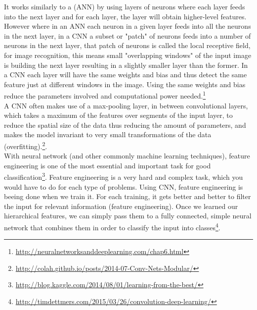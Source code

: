 \documentclass{article}
\begin{document}
It works similarly to a (ANN) by using layers of neurons where each layer feeds into the next layer and for each layer, the layer will obtain higher-level features.\\

However where in an ANN each neuron in a given layer feeds into all the neurons in the next layer, in a CNN a subset or "patch" of neurons feeds into a number of neurons in the next layer, that patch of neurons is called the local receptive field, for image recognition, this means small "overlapping windows" of the input image is building the next layer resulting in a slightly smaller layer than the former. In a CNN each layer will have the same weights and bias and thus detect the same feature just at different windows in the image. Using the same weights and bias reduce the parameters involved and computational power needed.\footnote{\url{http://neuralnetworksanddeeplearning.com/chap6.html}}\\

A CNN often makes use of a max-pooling layer, in between convolutional layers, which takes a maximum of the features over segments of the input layer, to reduce the spatial size of the data thus reducing the amount of parameters, and makes the model invariant to very small transformations of the data (overfitting).\footnote{\url{http://colah.github.io/posts/2014-07-Conv-Nets-Modular/}}.\\

With neural network (and other commonly machine learning techniques), feature engineering is one of the most essential and important task for good classification\footnote{\url{http://blog.kaggle.com/2014/08/01/learning-from-the-best/}}. Feature engineering is a very hard and complex task, which you would have to do for each type of problems. Using CNN, feature engineering is beeing done when we train it. 
For each training, it gets better and better to filter the input for relevant information (feature engineering). Once we learned our hierarchical features, we can simply pass them to a fully connected, simple neural network that combines them in order to classify the input into classes\footnote{\url{http://timdettmers.com/2015/03/26/convolution-deep-learning/}}.\\
\end{document}
